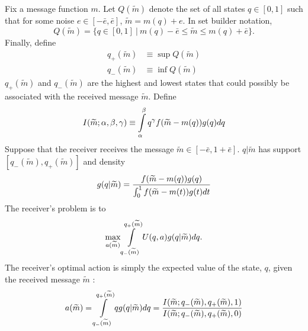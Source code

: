 \documentclass[12pt]{article}
\begin{document}
Fix a message function $m$. Let $Q(\widetilde{m})$ denote the set of all states $q\in [ 0,1]$ such that for some noise $e\in [ -\bar{e},\bar{e}]$, $\widetilde{m}=m(q)+e$. In set builder notation,
\begin{equation}
	Q(\widetilde{m})=\{q\in[0,1]\:|\:m(q)-\bar{e}\leq \widetilde{m}\leq m(q)+\bar{e}\}.
\end{equation}
Finally, define
\begin{align}
	q_{+}(\widetilde{m})&\equiv \sup Q(\widetilde{m})\\
	q_{-}(\widetilde{m})&\equiv \inf Q(\widetilde{m})
\end{align}
$q_{+}(\widetilde{m})$ and $ q_{-}(\widetilde{m})$ are the highest and lowest states that could possibly be associated with the received message $\widetilde{m}$. Define
\begin{equation}
	I(\widetilde{m};\alpha,\beta,\gamma)\equiv\int\displaylimits_{\alpha}^{\beta}{q^{\gamma}f(\widetilde{m}-m(q))g(q)dq}
\end{equation}
Suppose that the receiver receives the message $\widetilde{m}\in [ - \bar{e},1+\bar{e}]$. $q|\widetilde{m}$ has support $[q_{-}( \widetilde{m}),q_{+}(\widetilde{m})]$ and density
\begin{equation}\label{eq:posterior} 
	g(q|\widetilde{m})=\frac{f(\widetilde{m}-m(q))g(q)}{\int\displaylimits_{0}^{1}{ f(\widetilde{m}-m(t))g(t)dt}}  
\end{equation} 
The receiver's problem is to 
\begin{equation} 
	\max_{a(\widetilde{m})}\int\displaylimits_{q_{-}(\widetilde{m})}^{q_{+}(\widetilde{m})}{U(q,a)g(q|\widetilde{m})}dq.  
\end{equation} 
The receiver's optimal action is simply the expected value of the state, $q$, given the received message $\widetilde{m}$ : 
\begin{equation}
	a(\widetilde{m})=\int\displaylimits_{q_{-}(\widetilde{m})}^{q_{+}(\widetilde{m})}{qg(q| \widetilde{m})dq}=\frac{I(\widetilde{m};q_{-}(\widetilde{m}),q_{+}(\widetilde{m}),1)}{I(\widetilde{m};q_{-}(\widetilde{m}),q_{+}(\widetilde{m}),0)}\label{eq:optact} 
\end{equation}
\end{document}
